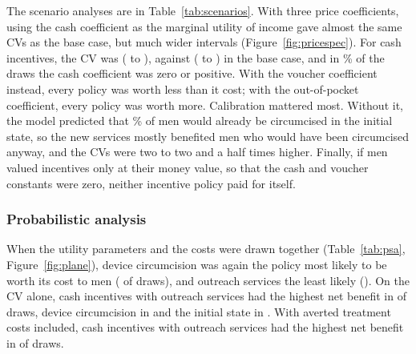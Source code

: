 \documentclass[11pt]{article}
\numberwithin{equation}{section}\numberwithin{figure}{section}\numberwithin{table}{section}
\begin{document}
The scenario analyses are in Table~\ref{tab:scenarios}. With three price coefficients, using the cash coefficient as the marginal utility of income gave almost the same CVs as the base case, but much wider intervals (Figure~\ref{fig:pricespec}). For cash incentives, the CV was \mmcPFourCVthree{} (\mmcPFourCVthreeLo{} to \mmcPFourCVthreeHi), against \mmcPFourCV{} (\mmcPFourCVlo{} to \mmcPFourCVhi) in the base case, and in \mmcpctDroppedThree\% of the draws the cash coefficient was zero or positive. With the voucher coefficient instead, every policy was worth less than it cost; with the out-of-pocket coefficient, every policy was worth more. Calibration mattered most. Without it, the model predicted that \mmcuncalUptake\% of men would already be circumcised in the initial state, so the new services mostly benefited men who would have been circumcised anyway, and the CVs were two to two and a half times higher. Finally, if men valued incentives only at their money value, so that the cash and voucher constants were zero, neither incentive policy paid for itself.

\begin{table}[!htbp]
\centering
\caption{Scenario analyses: net benefit based on the CV (CV minus incremental cost) per uncircumcised man (2017 US\$).}\label{tab:scenarios}
\small

\end{table}

\subsubsection{Probabilistic analysis}
When the utility parameters and the costs were drawn together (Table~\ref{tab:psa}, Figure~\ref{fig:plane}), device circumcision was again the policy most likely to be worth its cost to men (\mmcPTwoPSAnbcvP{} of draws), and outreach services the least likely (\mmcPOnePSAnbcvP). On the CV alone, cash incentives with outreach services had the highest net benefit in \mmcPFiveBestCV{} of draws, device circumcision in \mmcPTwoBestCV{} and the initial state in \mmcInitBestCV. With averted treatment costs included, cash incentives with outreach services had the highest net benefit in \mmcPFiveBestTotal{} of draws.

\begin{table}[!htbp]
\centering
\caption{Probabilistic analysis: net benefit per uncircumcised man (2017 US\$) and the probability that each policy has the highest net benefit (5,000 draws).}\label{tab:psa}
\small
{}
\end{table}
\end{document}
